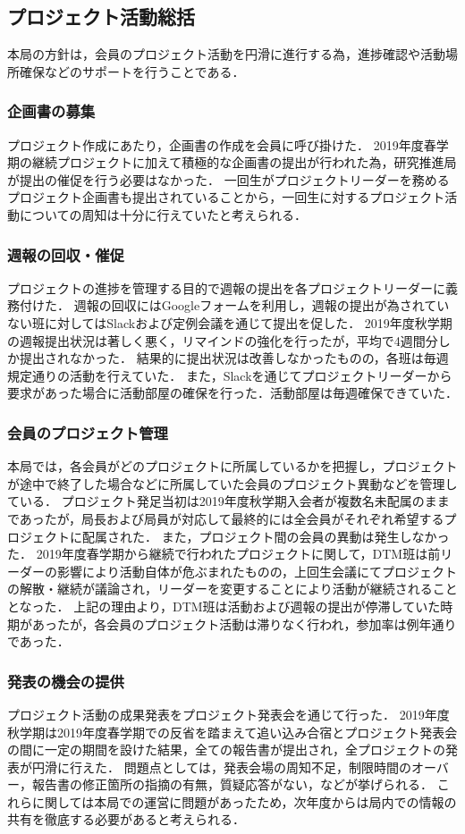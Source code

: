 \subsection*{プロジェクト活動総括}

本局の方針は，会員のプロジェクト活動を円滑に進行する為，進捗確認や活動場所確保などのサポートを行うことである．

\subsubsection*{企画書の募集}
	
プロジェクト作成にあたり，企画書の作成を会員に呼び掛けた．
2019年度春学期の継続プロジェクトに加えて積極的な企画書の提出が行われた為，研究推進局が提出の催促を行う必要はなかった．
一回生がプロジェクトリーダーを務めるプロジェクト企画書も提出されていることから，一回生に対するプロジェクト活動についての周知は十分に行えていたと考えられる．

\subsubsection*{週報の回収・催促}

プロジェクトの進捗を管理する目的で週報の提出を各プロジェクトリーダーに義務付けた．
週報の回収にはGoogleフォームを利用し，週報の提出が為されていない班に対してはSlackおよび定例会議を通じて提出を促した．
2019年度秋学期の週報提出状況は著しく悪く，リマインドの強化を行ったが，平均で4週間分しか提出されなかった．
結果的に提出状況は改善しなかったものの，各班は毎週規定通りの活動を行えていた．
また，Slackを通じてプロジェクトリーダーから要求があった場合に活動部屋の確保を行った．活動部屋は毎週確保できていた．

\subsubsection*{会員のプロジェクト管理}

本局では，各会員がどのプロジェクトに所属しているかを把握し，プロジェクトが途中で終了した場合などに所属していた会員のプロジェクト異動などを管理している．
プロジェクト発足当初は2019年度秋学期入会者が複数名未配属のままであったが，局長および局員が対応して最終的には全会員がそれぞれ希望するプロジェクトに配属された．
また，プロジェクト間の会員の異動は発生しなかった．
2019年度春学期から継続で行われたプロジェクトに関して，DTM班は前リーダーの影響により活動自体が危ぶまれたものの，上回生会議にてプロジェクトの解散・継続が議論され，リーダーを変更することにより活動が継続されることとなった．
上記の理由より，DTM班は活動および週報の提出が停滞していた時期があったが，各会員のプロジェクト活動は滞りなく行われ，参加率は例年通りであった．

\subsubsection*{発表の機会の提供}

プロジェクト活動の成果発表をプロジェクト発表会を通じて行った．
2019年度秋学期は2019年度春学期での反省を踏まえて追い込み合宿とプロジェクト発表会の間に一定の期間を設けた結果，全ての報告書が提出され，全プロジェクトの発表が円滑に行えた．
問題点としては，発表会場の周知不足，制限時間のオーバー，報告書の修正箇所の指摘の有無，質疑応答がない，などが挙げられる．
これらに関しては本局での運営に問題があったため，次年度からは局内での情報の共有を徹底する必要があると考えられる．